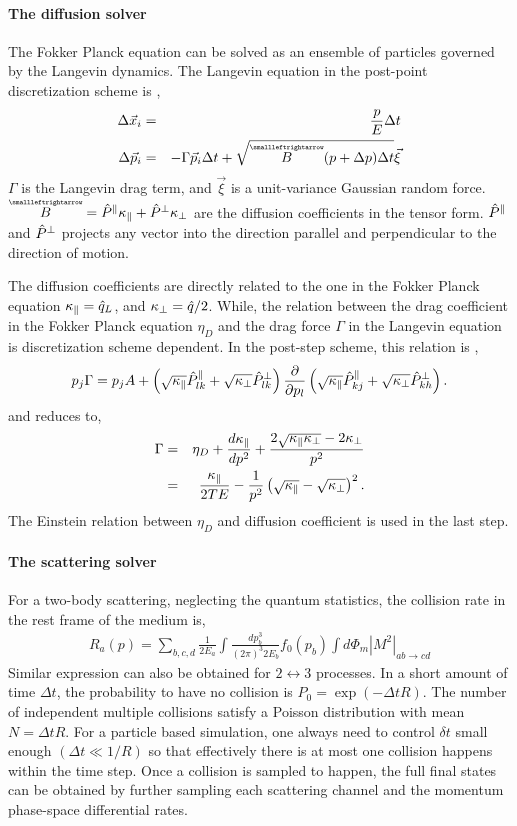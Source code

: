\paragraph{The diffusion solver}
The Fokker Planck equation can be solved as an ensemble of particles governed by the Langevin dynamics.
The Langevin equation in the post-point discretization scheme is \cite{He:2013zua},
\begin{eqnarray}
\Delta \vec{x}_i &=& \frac{p}{E}\Delta t\\
\Delta \vec{p}_i &=& -\Gamma \vec{p}_i \Delta t + \sqrt{\tensor{B}(p+\Delta p) \Delta t  }\vec{\xi}
\end{eqnarray}
$\Gamma$ is the Langevin drag term, and $\vec{\xi}$ is a unit-variance Gaussian random force.
$\tensor{B} = \Ppara \Kpara + \Pperp \Kperp$ are the diffusion coefficients in the tensor form.
$\hat{P}^{\|}$ and $\hat{P}^{\perp}$ projects any vector into the direction parallel and perpendicular to the direction of motion.

The diffusion coefficients are directly related to the one in the Fokker Planck equation $\kappa_{\|} = \hat{q}_L$, and $\kappa_{\perp} = \hat{q}/2$.
While, the relation between the drag coefficient in the Fokker Planck equation $\eta_D$ and the drag force $\Gamma$ in the Langevin equation is discretization scheme dependent.
In the post-step scheme, this relation is  \cite{He:2013zua},
\begin{eqnarray}
p_j \Gamma  = p_jA + \left(\sqrt{\kappa_{\|}}\hat{P}^{\|}_{lk} + \sqrt{\kappa_{\perp}}\hat{P}^{\perp}_{lk}\right) \frac{\partial}{\partial p_l} \left( \sqrt{\kappa_{\|}}\hat{P}^{\|}_{kj} + \sqrt{\kappa_{\perp}}\hat{P}^{\perp}_{kh} \right).
\end{eqnarray}
and reduces to,
\begin{eqnarray}
\Gamma &=& \eta_D + \frac{d \kappa_{\|}}{dp^2} + \frac{2\sqrt{\kappa_{\|}\kappa_{\perp}} - 2\kappa_{\perp}}{p^2} \\
 &=& \frac{\kappa_{\|}}{2TE} - \frac{1}{p^2}\left( \sqrt{\kappa_{\|}} - \sqrt{\kappa_{\perp}} \right)^2.
\end{eqnarray}
The Einstein relation between $\eta_D$ and diffusion coefficient is used in the last step.

\paragraph{The scattering solver}
For a two-body scattering, neglecting the quantum statistics, the collision rate in the rest frame of the medium is,
\begin{eqnarray}
R_a(p) = \sum_{b,c,d}\frac{1}{2E_a}\int \frac{dp_b^3}{(2\pi)^3 2E_b} f_0(p_b) \int d\Phi_m |M^2|_{ab\rightarrow cd}
\end{eqnarray}
Similar expression can also be obtained for $2\leftrightarrow 3$ processes.
In a short amount of time $\Delta t$, the probability to have no collision is $P_{0} = \exp(-\Delta t R)$.
The number of independent multiple collisions satisfy a Poisson distribution with mean $N = \Delta t R$. 
For a particle based simulation, one always need to control $\delta t$ small enough $(\Delta t \ll 1/R)$ so that effectively there is at most one collision happens within the time step.
Once a collision is sampled to happen, the full final states can be obtained by further sampling each scattering channel and the momentum phase-space differential rates.

